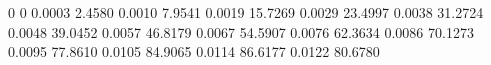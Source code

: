 0	0
0.0003	2.4580
0.0010	7.9541
0.0019	15.7269
0.0029	23.4997
0.0038	31.2724
0.0048	39.0452
0.0057	46.8179
0.0067	54.5907
0.0076	62.3634
0.0086	70.1273
0.0095	77.8610
0.0105	84.9065
0.0114	86.6177
0.0122	80.6780
